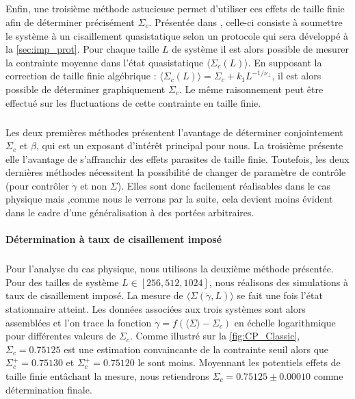 \subparagraph{}Enfin, une troisième méthode astucieuse permet d'utiliser ces effets de taille finie afin de déterminer précisément $\Sigma_c$. Présentée dans \cite{lin_scaling_2014}, celle-ci consiste à soumettre le système à un cisaillement quasistatique selon un protocole qui sera développé à la \autoref{sec:imp_prot}. Pour chaque taille $L$ de système il est alors possible de mesurer la contrainte moyenne dans l'état quasistatique $\langle\Sigma_c (L)\rangle$. En supposant la correction de taille finie algébrique : $\langle\Sigma_c (L)\rangle = \Sigma_c+k_1 L^{-1/\nu_\perp}$, il est alors possible de déterminer graphiquement $\Sigma_c$. Le même raisonnement peut être effectué sur les fluctuations de cette contrainte en taille finie.

\subparagraph{}Les deux premières méthodes présentent l'avantage de déterminer conjointement $\Sigma_c$ et $\beta$, qui est un exposant d'intérêt principal pour nous. La troisième présente elle l'avantage de s'affranchir des effets parasites de taille finie. Toutefois, les deux dernières méthodes nécessitent la possibilité de changer de paramètre de contrôle (pour contrôler $\dot{\gamma}$ et non $\Sigma$). Elles sont donc facilement réalisables dans le cas physique mais ,comme nous le verrons par la suite, cela devient moins évident dans le cadre d'une généralisation à des portées arbitraires. 

\paragraph{Détermination à taux de cisaillement imposé}

\label{sec:CP_Picard}

\subparagraph{}Pour l'analyse du cas physique, nous utilisons la deuxième méthode présentée. Pour des tailles de système $L \in [256, 512, 1024]$, nous réalisons des simulations à taux de cisaillement imposé. La mesure de $\langle \Sigma (\dot{\gamma},L)\rangle$ se fait une fois l'état stationnaire atteint. Les données associées aux trois systèmes sont alors assemblées et l'on trace la fonction $\dot{\gamma} = f(\langle \Sigma \rangle - \Sigma_c)$ en échelle logarithmique pour différentes valeurs de $\Sigma_c$. Comme illustré sur la \autoref{fig:CP_Classic}, $\Sigma_c=0.75125$ est une estimation convaincante de la contrainte seuil alors que $\Sigma_c^+=0.75130$ et $\Sigma_c^+=0.75120$ le sont moins. Moyennant les potentiels effets de taille finie entâchant la mesure, nous retiendrons $\Sigma_c=0.75125 \pm 0.00010$ comme détermination finale.

